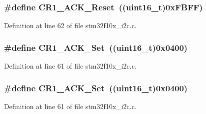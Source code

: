 \subsubsection[{\texorpdfstring{C\+R1\+\_\+\+A\+C\+K\+\_\+\+Reset}{CR1_ACK_Reset}}]{\setlength{\rightskip}{0pt plus 5cm}\#define C\+R1\+\_\+\+A\+C\+K\+\_\+\+Reset~(({\bf uint16\+\_\+t})0x\+F\+B\+F\+F)}\hypertarget{group___i2_c___private___defines_gaa8bcbe2f6089d896aff8e7770368aada}{}\label{group___i2_c___private___defines_gaa8bcbe2f6089d896aff8e7770368aada}


Definition at line 62 of file stm32f10x\+\_\+i2c.\+c.

\subsubsection[{\texorpdfstring{C\+R1\+\_\+\+A\+C\+K\+\_\+\+Set}{CR1_ACK_Set}}]{\setlength{\rightskip}{0pt plus 5cm}\#define C\+R1\+\_\+\+A\+C\+K\+\_\+\+Set~(({\bf uint16\+\_\+t})0x0400)}\hypertarget{group___i2_c___private___defines_ga1f74487a0fbffdcd8a4c440c732dc316}{}\label{group___i2_c___private___defines_ga1f74487a0fbffdcd8a4c440c732dc316}


Definition at line 61 of file stm32f10x\+\_\+i2c.\+c.

\subsubsection[{\texorpdfstring{C\+R1\+\_\+\+A\+C\+K\+\_\+\+Set}{CR1_ACK_Set}}]{\setlength{\rightskip}{0pt plus 5cm}\#define C\+R1\+\_\+\+A\+C\+K\+\_\+\+Set~(({\bf uint16\+\_\+t})0x0400)}\hypertarget{group___i2_c___private___defines_ga1f74487a0fbffdcd8a4c440c732dc316}{}\label{group___i2_c___private___defines_ga1f74487a0fbffdcd8a4c440c732dc316}


Definition at line 61 of file stm32f10x\+\_\+i2c.\+c.

